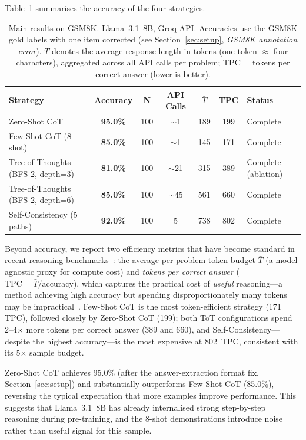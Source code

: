 \documentclass[conference]{IEEEtran}
\begin{document}
Table~\ref{tab:main} summarises the accuracy of the four strategies.

\begin{table}[t]
\centering
\caption{Main results on GSM8K. Llama~3.1~8B, Groq API.
Accuracies use the GSM8K gold labels with one item corrected (see
Section~\ref{sec:setup}, \emph{GSM8K annotation error}).
$\bar{T}$ denotes the average response length in tokens (one token
$\approx$ four characters), aggregated across all API calls per problem;
TPC = tokens per correct answer (lower is better).}
\label{tab:main}
\begin{tabular}{@{}lcccccl@{}}
\toprule
\textbf{Strategy} & \textbf{Accuracy} & \textbf{N} &
\textbf{API Calls} & \boldmath$\bar{T}$ & \textbf{TPC} & \textbf{Status} \\
\midrule
Zero-Shot CoT                     & \textbf{95.0\%} & 100 & $\sim$1  & 189  & 199  & Complete \\
Few-Shot CoT (8-shot)             & \textbf{85.0\%} & 100 & $\sim$1  & 145  & 171  & Complete \\
Tree-of-Thoughts (BFS-2, depth=3) & \textbf{81.0\%} & 100 & $\sim$21 & 315  & 389  & Complete (ablation) \\
Tree-of-Thoughts (BFS-2, depth=6) & \textbf{85.0\%} & 100 & $\sim$45 & 561  & 660  & Complete \\
Self-Consistency (5 paths)        & \textbf{92.0\%} & 100 & 5        & 738  & 802  & Complete \\
\bottomrule
\end{tabular}
\end{table}

Beyond accuracy, we report two efficiency metrics that have become
standard in recent reasoning benchmarks~\cite{ockbench2025,tale2024}:
the average per-problem token budget $\bar{T}$ (a model-agnostic proxy
for compute cost) and \textit{tokens per correct answer}
($\text{TPC} = \bar{T} / \text{accuracy}$), which captures the
practical cost of \emph{useful} reasoning---a method achieving high
accuracy but spending disproportionately many tokens may be
impractical~\cite{yao2023tot,ockbench2025}.
Few-Shot CoT is the most token-efficient strategy (171 TPC), followed
closely by Zero-Shot CoT (199); both ToT configurations spend
2--4$\times$ more tokens per correct answer (389 and 660), and
Self-Consistency---despite the highest accuracy---is the most expensive
at 802~TPC, consistent with its 5$\times$ sample budget.

Zero-Shot CoT achieves 95.0\% (after the answer-extraction
format fix, Section~\ref{sec:setup}) and substantially
outperforms Few-Shot CoT (85.0\%), reversing the typical
expectation that more examples improve performance.
This suggests that Llama~3.1~8B has already internalised strong
step-by-step reasoning during pre-training, and the 8-shot
demonstrations introduce noise rather than useful signal for this
sample.
\end{document}
